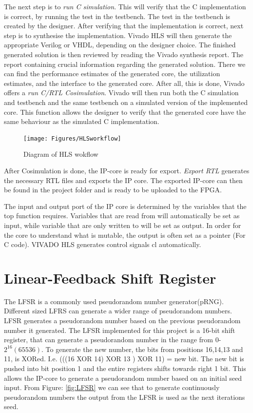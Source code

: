 The next step is to \textit{run C simulation}. This will verify that the C implementation is correct, by running the test in the testbench. The test in the testbench is created by the designer. After verifying that the implementation is correct, next step is to synthesise the implementation. Vivado HLS will then generate the appropriate Verilog or VHDL, depending on the designer choice. The finished generated solution is then reviewed by reading the Vivado synthesis report. The report containing crucial information regarding the generated solution. There we can find the performance estimates of the generated core, the utilization estimates, and the interface to the generated core. After all, this is done, Vivado offers a \textit{run C/RTL Cosimulation}. Vivado will then run both the C simulation and testbench and the same testbench on a simulated version of the implemented core. This function allows the designer to verify that the generated core have the same behaviour as the simulated C implementation.

\begin{figure}
\centerline{\texttt{[image: Figures/HLSworkflow]}}
\caption{Diagram of HLS wokflow}
    \label{fig:hlsworkflow}
\end{figure} 
After Cosimulation is done, the IP-core is ready for export. \textit{Export RTL} generates the necessary RTL files and exports the IP core. The exported IP-core can then be found in the project folder and is ready to be uploaded to the FPGA. 

The input and output port of the IP core is determined by the variables that the top function requires. Variables that are read from will automatically be set as input, while variable that are only written to will be set as output. In order for the core to understand what is mutable, the output is often set as a pointer (For C code). VIVADO HLS generates control signals cl automatically. 

\section{Linear-Feedback Shift Register}
The LFSR is a commonly used pseudorandom number generator(pRNG)\citep{murase1992linear}. Different sized LFRS can generate a wider range of pseudorandom numbers. LFSR generates a pseudorandom number based on the previous pseudorandom number it generated. The LFSR implemented for this project is a 16-bit shift register, that can generate a pseudorandom number in the range from 0-$2^{16}(65536)$. To generate the new number, the bits from positions 16,14,13 and 11, is XORed. I.e. (((16 XOR 14) XOR 13 ) XOR 11) = new bit. The new bit is pushed into bit position 1 and the entire registers shifts towards right 1 bit. 
This allows the IP-core to generate a pseudorandom number based on an initial seed input. From Figure: \ref{fig:LFSR} we can see that to generate continuously pseudorandom numbers the output from the LFSR is used as the next iterations seed. 

